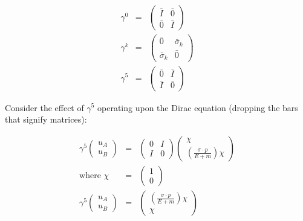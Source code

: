 \begin{eqnarray*}
  \gamma^0 & = &
  \left(
    \begin{array}{cc}
    \bar{I} & \bar{0} \\
    \bar{0} & \bar{I}
    \end{array}
  \right)
  \\
  \gamma^k & = &
  \left(
    \begin{array}{cc}
    \bar{0} & \bar{\sigma}_k \\
    \bar{\sigma}_k & \bar{0}
    \end{array}
  \right)
  \\
  \gamma^5 & = &
  \left(
    \begin{array}{cc}
    \bar{0} & \bar{I} \\
    \bar{I} & \bar{0}
    \end{array}
  \right)
\end{eqnarray*}

Consider the effect of $\gamma^5$ operating upon the Dirac equation (dropping the bars that signify matrices):

\begin{eqnarray*}
  \gamma^5
  \left(
    \begin{array}{c}
    u_A \\
    u_B
    \end{array}
  \right)
  & = &
  \left(
    \begin{array}{cc}
    0 & I \\
    I & 0
    \end{array}
  \right)
  \left(
    \begin{array}{c}
    \chi \\
    \left(\frac{\sigma\cdot p}{E + m}\right)\chi
    \end{array}
  \right)
  \\
  \textrm{where }\chi & = &
  \left(
    \begin{array}{c}
    1 \\
    0
    \end{array}
  \right)
  \\
  \gamma^5
  \left(
    \begin{array}{c}
    u_A \\
    u_B
    \end{array}
  \right)
  & = &
  \left(
    \begin{array}{c}
    \left(\frac{\sigma\cdot p}{E + m}\right)\chi \\
    \chi
    \end{array}
  \right)
\end{eqnarray*}

